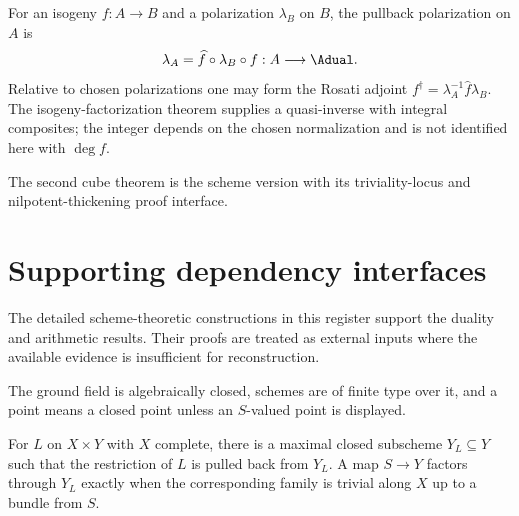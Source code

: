 \begin{corollary}
\label{mumford-cor-dual-isogeny}
For an isogeny $f:A\to B$ and a polarization $\lambda_B$ on $B$, the pullback
polarization on $A$ is
\[
 \lambda_A=\widehat f\circ\lambda_B\circ f:A\longrightarrow\Adual.
\]
Relative to chosen polarizations one may form the Rosati adjoint
$f^\dagger=\lambda_A^{-1}\widehat f\lambda_B$.  The isogeny-factorization
theorem supplies a quasi-inverse with integral composites; the integer depends
on the chosen normalization and is not identified here with $\deg f$.
\notready
\end{corollary}

\begin{remark}
\label{mumford3-cube-theorem-ii}
The second cube theorem is the scheme version with its triviality-locus and
nilpotent-thickening proof interface.
\notready
\end{remark}

\section{Supporting dependency interfaces}
\label{mumford-III-coverage-register}
The detailed scheme-theoretic constructions in this register support the
duality and arithmetic results.  Their proofs are treated as external inputs
where the available evidence is insufficient for reconstruction.

\begin{convention}
\label{mumford3-standing-scheme-conventions}
The ground field is algebraically closed, schemes are of finite type over it,
and a point means a closed point unless an $S$-valued point is displayed.
\notready
\end{convention}

\begin{definition}
\label{mumford3-cube-triviality-locus}
For $L$ on $X\times Y$ with $X$ complete, there is a maximal closed subscheme
$Y_L\subseteq Y$ such that the restriction of $L$ is pulled back from $Y_L$.
A map $S\to Y$ factors through $Y_L$ exactly when the corresponding family is
trivial along $X$ up to a bundle from $S$.
\notready
\end{definition}

